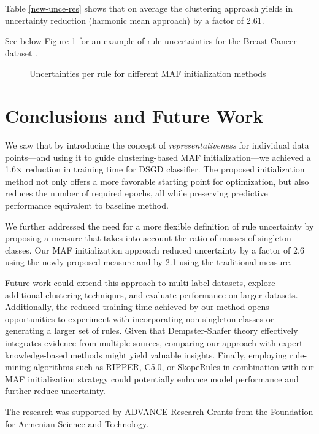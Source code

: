 \documentclass[10pt,a4paper,oneside]{article}
\begin{document}
Table \ref{new-unce-res} shows that on average the clustering approach yields in uncertainty reduction (harmonic mean approach) by a factor of 2.61.

{\color{black}
See below Figure \ref{fig:bars} for an example of rule uncertainties for the Breast Cancer dataset \cite{breastCancer}.
}
\FloatBarrier
\begin{figure}[htbp]
    \caption{Uncertainties per rule for different MAF initialization methods}
    \label{fig:bars}
\end{figure}


\section{Conclusions and Future Work}
We saw that by introducing the concept of \textit{representativeness} for individual data points—and using it to guide clustering-based MAF initialization—we achieved a 1.6× reduction in training time for DSGD classifier. The proposed initialization method not only offers a more favorable starting point for optimization{\color{black},} but also reduces the number of required epochs, all while preserving predictive performance equivalent to baseline method.

We further addressed the need for a more flexible definition of rule uncertainty by proposing a measure that takes into account the ratio of masses of singleton classes. Our MAF initialization approach reduced uncertainty by a factor of 2.6 using the newly proposed measure and by 2.1 using the traditional measure.

{\color{red}
Future work could extend this approach to multi-label datasets, explore additional clustering techniques, and evaluate performance on larger datasets. Additionally, the reduced training time achieved by our method opens opportunities to experiment with incorporating non-singleton classes or generating a larger set of rules. Given that Dempster-Shafer theory effectively integrates evidence from multiple sources, comparing our approach with expert knowledge-based methods might yield valuable insights. Finally, employing rule-mining algorithms such as RIPPER, C5.0, or SkopeRules \cite{ripper, c5, skoperules} in combination with our MAF initialization strategy could potentially enhance model performance and further reduce uncertainty.
}
\begin{Acknowledgements}
The research was supported by ADVANCE Research Grants from the Foundation for Armenian Science and Technology.
\end{Acknowledgements}
\end{document}
